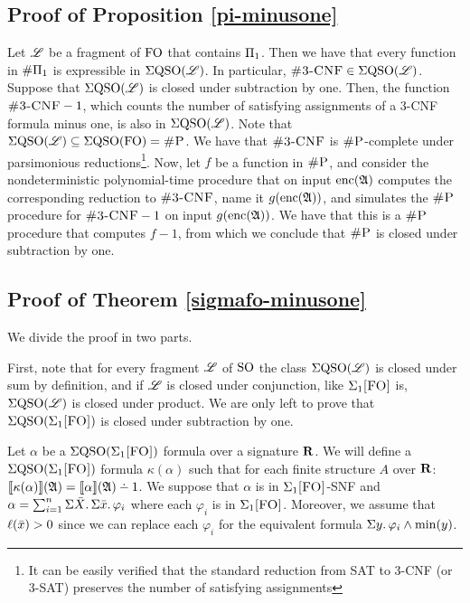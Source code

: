 \subsection*{Proof of Proposition \ref{pi-minusone}}

Let $\mathscr{L}$ be a fragment of ${\rm FO}$ that contains $\Pi_{1}$. Then we have that every function in $\#\Pi_{1}$ is expressible in $\Sigma{\rm QSO}(\mathscr{L})$. In particular, $\ctcnf \in \eqso(\LL)$. Suppose that $\Sigma{\rm QSO}(\mathscr{L})$ is closed under subtraction by one. Then, the function $\ctcnf-1$, which counts the number of satisfying assignments of a 3-CNF formula minus one, is also in $\Sigma{\rm QSO}(\mathscr{L})$. Note that $\Sigma{\rm QSO}(\mathscr{L}) \subseteq \Sigma{\rm QSO}({\rm FO}) = \text{\sc \#P}$. We have that $\ctcnf$ is $\text{\sc \#P}$-complete under parsimonious reductions\footnote{It can be easily verified that the standard reduction from SAT to 3-CNF (or 3-SAT) preserves the number of satisfying assignments}. Now, let $f$ be a function in $\text{\sc \#P}$, and consider the nondeterministic polynomial-time procedure that on input ${\rm enc}(\mathfrak{A})$ computes the corresponding reduction to $\ctcnf$, name it $g({\rm enc}(\mathfrak{A}))$, and simulates the $\text{\sc \#P}$ procedure for $\ctcnf-1$ on input $g({\rm enc}(\mathfrak{A}))$. We have that this is a $\text{\sc \#P}$ procedure that computes $f-1$, from which we conclude that $\text{\sc \#P}$ is closed under subtraction by one.










\subsection*{Proof of Theorem \ref{sigmafo-minusone}}

We divide the proof in two parts.

\vspace{1em}
First, note that for every fragment $\mathscr{L}$ of ${\rm SO}$ the class $\Sigma{\rm QSO}(\mathscr{L})$ is closed under sum by definition, and if $\mathscr{L}$ is closed under conjunction, like $\Sigma_{1}\textsc{[FO]}$ is, $\Sigma{\rm QSO}(\mathscr{L})$ is closed under product. We are only left to prove that $\Sigma{\rm QSO}(\Sigma_{1}\textsc{[FO]})$ is closed under subtraction by one.

Let $\alpha$ be a $\Sigma{\rm QSO}(\Sigma_{1}\textsc{[FO]})$ formula over a signature $\mathbf{R}$. We will define a $\Sigma{\rm QSO}(\Sigma_{1}\textsc{[FO]})$ formula $\kappa(\alpha)$ such that for each finite structure $A$ over $\mathbf{R}$: $\sem{\kappa(\alpha)}(\A) = \sem{\alpha}(\A) \dotminus 1$. We suppose that $\alpha$ is in $\Sigma_{1}\textsc{[FO]}$-SNF and $\alpha = \sum_{i = 1}^{n}\Sigma{\bar{X}}.\,\Sigma{\bar{x}}.\,\varphi_i$ where each $\varphi_i$ is in $\Sigma_{1}\textsc{[FO]}$. Moreover, we assume that $\ell(\bar{x}) > 0$ since we can replace each $\varphi_i$ for the equivalent formula $\Sigma{y}.\,\varphi_i\wedge\min(y)$.

